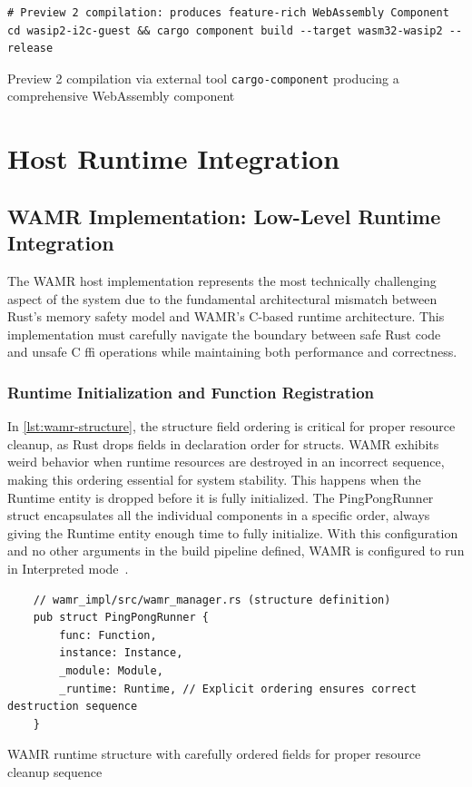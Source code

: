 \begin{listing}[H]
\begin{verbatim}
# Preview 2 compilation: produces feature-rich WebAssembly Component
cd wasip2-i2c-guest && cargo component build --target wasm32-wasip2 --release
\end{verbatim}
\caption{Preview 2 compilation via external tool \texttt{cargo-component} producing a comprehensive WebAssembly component}
\label{lst:preview2-compilation}
\end{listing}

\section{Host Runtime Integration}
\label{sec:host-runtime-integration}

\subsection{WAMR Implementation: Low-Level Runtime Integration}

The WAMR host implementation represents the most technically challenging aspect of the system due to the fundamental architectural mismatch between Rust's memory safety model and WAMR's C-based runtime architecture. This implementation must carefully navigate the boundary between safe Rust code and unsafe C \acrshort{ffi} operations while maintaining both performance and correctness.

\subsubsection{Runtime Initialization and Function Registration}
In \autoref{lst:wamr-structure}, the structure field ordering is critical for proper resource cleanup, as Rust drops fields in declaration order for structs. WAMR exhibits weird behavior when runtime resources are destroyed in an incorrect sequence, making this ordering essential for system stability. This happens when the Runtime entity is dropped before it is fully initialized. The PingPongRunner struct encapsulates all the individual components in a specific order, always giving the Runtime entity enough time to fully initialize. With this configuration and no other arguments in the build pipeline defined, WAMR is configured to run in Interpreted mode~\cite{wamr_running_modes}.

\begin{listing}[H]
    \begin{verbatim}
    // wamr_impl/src/wamr_manager.rs (structure definition)
    pub struct PingPongRunner {
        func: Function,
        instance: Instance,
        _module: Module,
        _runtime: Runtime, // Explicit ordering ensures correct destruction sequence
    }
    \end{verbatim}
    \caption{WAMR runtime structure with carefully ordered fields for proper resource cleanup sequence}
    \label{lst:wamr-structure}
\end{listing}

